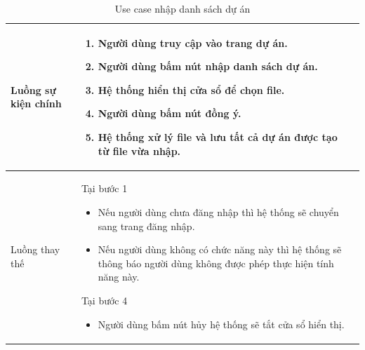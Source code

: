 \documentclass[12pt,a4paper]{article}
\begin{document}
\begin{table}[H]
\begin{tabular}{|p{3.5cm}|p{11.5cm}|c|}
            Luồng sự kiện chính & \vspace{-.8cm}\begin{enumerate}
                                                    \item Người dùng truy cập vào trang dự án.
                                                    \item Người dùng bấm nút nhập danh sách dự án.
                                                    \item Hệ thống hiển thị cửa sổ để chọn file.
                                                    \item Người dùng bấm nút đồng ý.
                                                    \item Hệ thống xử lý file và lưu tất cả dự án được tạo từ file vừa nhập.
            \end{enumerate}
            \\
            \hline
            Luồng thay thế & Tại bước 1\newline
            \vspace{-.8cm}\begin{itemize}
                              \item Nếu người dùng chưa đăng nhập thì hệ thống sẽ chuyển sang trang đăng nhập.
                              \item Nếu người dùng không có chức năng này thì hệ thống sẽ thông báo người dùng không được phép thực hiện tính năng này.
            \end{itemize}
            Tại bước 4\newline
            \vspace{-.8cm}\begin{itemize}
                              \item Người dùng bấm nút hủy hệ thống sẽ tắt cửa sổ hiển thị.
            \end{itemize}
            \\ \hline
        \end{tabular}
        \caption{Use case nhập danh sách dự án}

    \end{table}

\end{document}
